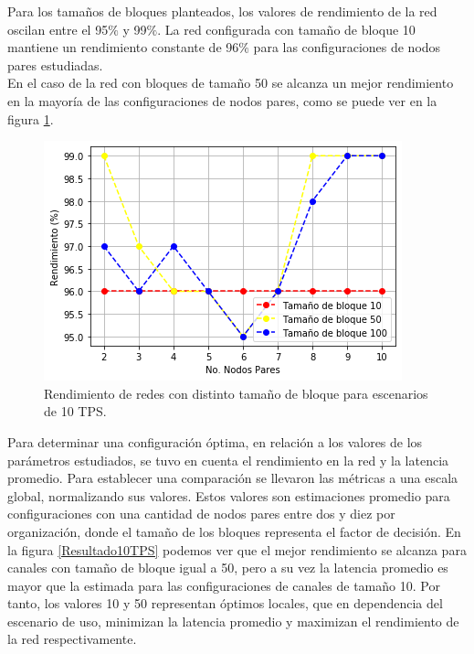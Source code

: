 Para los tama\~nos de bloques planteados, los valores de rendimiento de la red oscilan entre el 95$\%$ y 99$\%$. La red configurada con tama\~no de bloque 10 mantiene un rendimiento constante de 96$\%$ para las configuraciones de nodos pares estudiadas.\\

 En el caso de la red con bloques de tama\~no 50 se alcanza un mejor rendimiento en la mayor\'ia de las configuraciones de nodos pares, como se puede ver en la figura \ref{RendimientoPares10TPS}.\\

\begin{figure}[h]
\centering
\includegraphics[scale=0.5]{Graphics/RendimientoPares10TPS.png}
\caption{Rendimiento de redes con distinto tama\~no de bloque para escenarios de 10 TPS.}
\label{RendimientoPares10TPS}
\end{figure}

\newpage

Para determinar una configuraci\'on \'optima, en relaci\'on a los valores de los par\'ametros estudiados, se tuvo en cuenta el rendimiento en la red y la latencia promedio. Para establecer una comparaci\'on se llevaron las m\'etricas a una escala global, normalizando sus valores. Estos valores son estimaciones promedio para configuraciones con una cantidad de nodos pares entre dos y diez por organizaci\'on, donde el tama\~no de los bloques representa el factor de decisi\'on. En la figura \ref{Resultado10TPS} podemos ver que el mejor rendimiento se alcanza para canales con tama\~no de bloque igual a 50, pero a su vez la latencia promedio es mayor que la estimada para las configuraciones de canales de tama\~no 10. Por tanto, los valores 10 y 50 representan \'optimos locales, que en dependencia del escenario de uso, minimizan la latencia promedio y maximizan el rendimiento de la red respectivamente.\\


